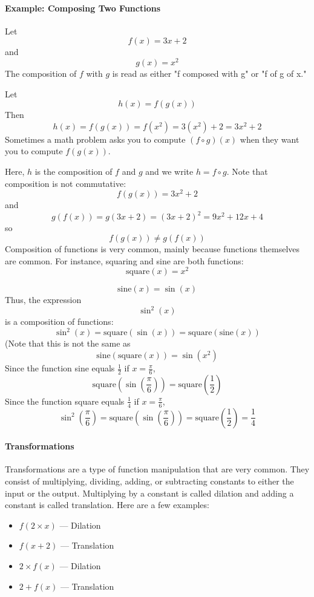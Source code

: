 \paragraph{Example: Composing Two Functions}

Let 
$$
f(x) = 3x + 2
$$
and 
$$
g(x) = x^2
$$
The composition of $f$ with $g$ is read as either "f composed with g" or "f of g of x."

Let
$$
h(x) = f(g(x))
$$
Then
$$
h(x) = f(g(x)) = f(x^2) = 3(x^2) + 2 = 3x^2 + 2
$$
Sometimes a math problem asks you to compute $(f \circ g)(x)$ when they want you to compute $f(g(x))$.

Here, $h$ is the composition of $f$ and $g$ and we write $h = f \circ g$. Note that composition is not commutative:
$$
f(g(x)) = 3x^2 + 2
$$
and
$$
g(f(x)) = g(3x + 2) = (3x + 2)^2 = 9x^2 + 12x + 4
$$
so 
$$
f(g(x)) \neq g(f(x))
$$
Composition of functions is very common, mainly because functions themselves are common. For instance, squaring and sine are both functions:
$$
\text{square}(x) = x^2
$$

$$
\text{sine}(x) = \sin(x)
$$
Thus, the expression 
$$
\sin^2(x)
$$ 
is a composition of functions:
$$
\sin^2(x) = \text{square}(\sin(x)) = \text{square}(\text{sine}(x))
$$
(Note that this is not the same as 
$$
\text{sine}(\text{square}(x)) = \sin(x^2)
$$
Since the function sine equals $\frac{1}{2}$ if $x = \frac{\pi}{6}$,
$$
\text{square}(\sin(\frac{\pi}{6})) = \text{square}(\frac{1}{2})
$$
Since the function square equals $\frac{1}{4}$ if $x = \frac{\pi}{6}$,
$$
\sin^2(\frac{\pi}{6}) = \text{square}(\sin(\frac{\pi}{6})) = \text{square}(\frac{1}{2}) = \frac{1}{4}
$$
\paragraph{Transformations}

Transformations are a type of function manipulation that are very common. They consist of multiplying, dividing, adding, or subtracting constants to either the input or the output. Multiplying by a constant is called dilation and adding a constant is called translation. Here are a few examples:

\begin{itemize}
    \item $ f(2 \times x) $ — Dilation
    \item $ f(x + 2) $ — Translation
    \item $ 2 \times f(x) $ — Dilation
    \item $ 2 + f(x) $ — Translation
\end{itemize}

